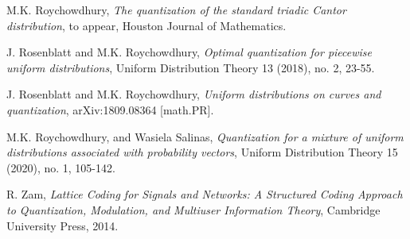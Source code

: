 \documentclass[12pt]{amsart}
\theoremstyle{plain}
\theoremstyle{definition}
\begin{document}
\begin{thebibliography}{9999}
 M.K. Roychowdhury, \emph{The quantization of the standard triadic Cantor distribution}, to appear, Houston Journal of Mathematics.

 J. Rosenblatt and M.K. Roychowdhury, \emph{Optimal quantization for piecewise uniform distributions}, Uniform Distribution Theory 13 (2018), no. 2, 23-55.

 J. Rosenblatt and M.K. Roychowdhury, \emph{Uniform distributions on curves and quantization}, arXiv:1809.08364 [math.PR].


 M.K. Roychowdhury, and Wasiela Salinas, \emph{Quantization for a mixture of uniform distributions associated with probability vectors}, Uniform Distribution Theory 15 (2020), no. 1, 105-142.







 R. Zam, \emph{Lattice Coding for Signals and Networks: A Structured Coding Approach to Quantization, Modulation, and Multiuser Information Theory}, Cambridge University Press, 2014.



\end{thebibliography}
\end{document}
